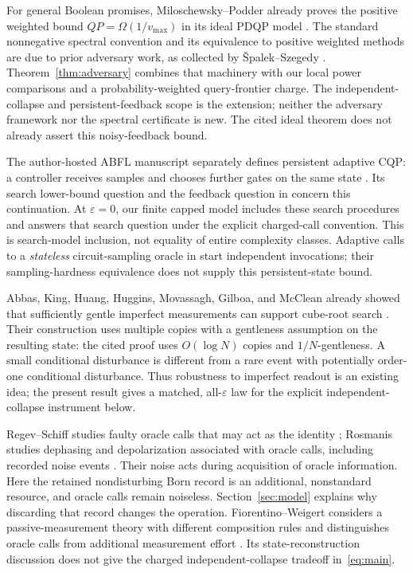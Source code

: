\documentclass[11pt]{article}
\theoremstyle{remark}
\newcommand{\eps}{\varepsilon}
\begin{document}
For general Boolean promises, Miloschewsky--Podder already proves the
positive weighted bound $QP=\Omega(1/v_{\max})$ in its ideal PDQP model
\cite[Lemma 4.3]{mp}. The standard nonnegative spectral convention and
its equivalence to positive weighted methods are due to prior adversary
work, as collected by \v{S}palek--Szegedy \cite[Theorem 3.1]{ss}.
Theorem~\ref{thm:adversary} combines that machinery with our local power
comparisons and a probability-weighted query-frontier charge. The
independent-collapse and persistent-feedback scope is the extension;
neither the adversary framework nor the spectral certificate is new.
The cited ideal theorem does not already assert this noisy-feedback bound.

The author-hosted ABFL manuscript separately defines persistent adaptive
CQP: a controller receives samples and chooses further gates on the same
state \cite[Sections 3, 6, 8]{abflcqp}. Its search lower-bound question and
the feedback question in \cite[Section 1.5]{mp} concern this continuation.
At $\eps=0$, our finite capped model includes these search procedures and
answers that search question under the explicit charged-call convention.
This is search-model inclusion, not equality of entire complexity classes.
Adaptive calls to a \emph{stateless} circuit-sampling oracle in
\cite[footnote 6, Section 5]{msy} start independent invocations; their
sampling-hardness equivalence does not supply this persistent-state bound.

Abbas, King, Huang, Huggins, Movassagh, Gilboa, and McClean already showed
that sufficiently gentle imperfect measurements can support cube-root
search \cite[Appendix E.4, Proposition 28]{abbas}. Their construction uses
multiple copies with a gentleness assumption on the resulting state: the
cited proof uses $O(\log N)$ copies and $1/N$-gentleness. A
small conditional disturbance is different from a rare event with potentially
order-one conditional disturbance. Thus robustness to imperfect readout is
an existing idea; the present result gives a matched, all-$\eps$ law for the
explicit independent-collapse instrument below.

Regev--Schiff studies faulty oracle calls that may act as the identity
\cite{rs}; Rosmanis studies dephasing and depolarization associated with oracle
calls, including recorded noise events \cite{rosmanis}. Their noise acts
during acquisition of oracle information. Here the retained nondisturbing
Born record is an additional, nonstandard resource, and oracle calls remain
noiseless. Section~\ref{sec:model} explains why discarding that record changes
the operation. Fiorentino--Weigert considers a passive-measurement theory
with different composition rules and distinguishes oracle calls from
additional measurement effort \cite{fw}. Its state-reconstruction discussion
does not give the charged independent-collapse tradeoff in~\eqref{eq:main}.
\end{document}
